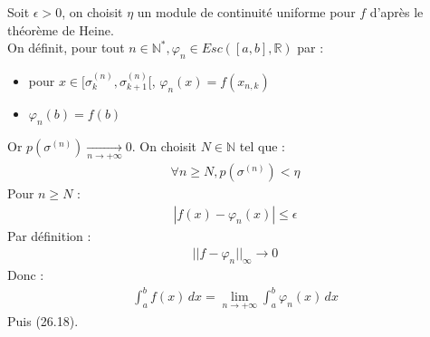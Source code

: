 \documentclass[../main.tex]{subfiles}
\begin{document}
\noindent Soit $\epsilon > 0$, on choisit $\eta$ un module de continuité uniforme pour $f$ d'après le théorème de Heine. \\
On définit, pour tout $n\in \mathbb{N}^*, \varphi_n \in Esc([a, b], \mathbb{R})$ par : 
\begin{itemize}
    \item pour $x\in [\sigma_k^{(n)}, \sigma_{k+1}^{(n)}[$, $\varphi_n(x) = f(x_{n,k})$
    \item $\varphi_n(b) = f(b)$
\end{itemize}
Or $p(\sigma^{(n)}) \underset{n \to +\infty}{\longrightarrow} 0$. On choisit $N\in \mathbb{N}$ tel que : 
\begin{align*}
    \forall n\geq N, p(\sigma^{(n)}) < \eta
\end{align*}
Pour $n\geq N$ : 
\begin{align*}
    |f(x) - \varphi_n(x)| \leq \epsilon
\end{align*}
Par définition : 
\begin{align*}
    ||f - \varphi_n||_{\infty} \longrightarrow 0
\end{align*}
Donc : 
\begin{align*}
    \int_{a}^{b} f(x) \,dx = \lim_{n\to +\infty} \int_{a}^{b} \varphi_n(x) \,dx
\end{align*}
Puis (26.18). 
\end{document}
